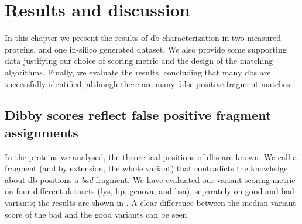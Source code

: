 \chapter{Results and discussion}

In this chapter we present the results of \gls*{db} characterization in two measured proteins, and one in-silico generated dataset. We also provide some supporting data justifying our choice of scoring metric and the design of the matching algorithms. Finally, we evaluate the results, concluding that many \glspl*{db} are successfully identified, although there are many false positive fragment matches.

\section{Dibby scores reflect false positive fragment assignments}

In the proteins we analysed, the theoretical positions of \glspl*{db} are known. We call a fragment (and by extension, the whole variant) that contradicts the knowledge about \gls*{db} positions a \emph{bad} fragment. We have evaluated our variant scoring metric on four different datasets (\gls*{lys}, \gls*{lip}, \gls*{genova}, and \gls*{bsa}), separately on good and bad variants; the results are shown in . A clear difference between the median variant score of the bad and the good variants can be seen.

